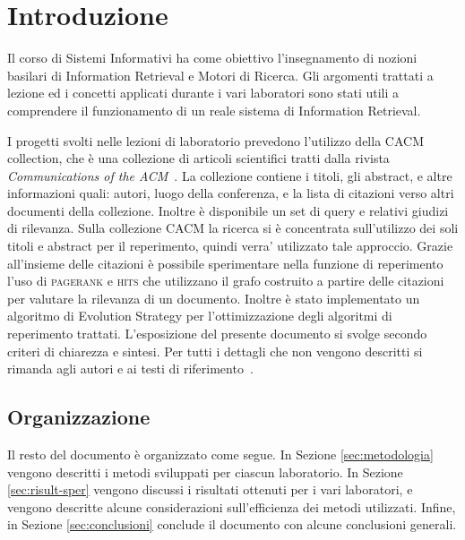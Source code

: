 \section{Introduzione}
\label{sec:introduzione}

Il corso di Sistemi Informativi ha come obiettivo l'insegnamento di nozioni basilari di Information Retrieval e Motori di Ricerca. Gli argomenti trattati a lezione ed i concetti applicati durante i vari laboratori sono stati utili a comprendere il funzionamento di un reale sistema di Information Retrieval.

I progetti svolti nelle lezioni di laboratorio prevedono l'utilizzo della CACM collection, che \`e una collezione di articoli scientifici tratti dalla rivista \textit{Communications of the ACM}~\cite{ACMCollection}. La collezione contiene i titoli, gli abstract, e altre informazioni quali: autori, luogo della conferenza, e la lista di citazioni verso altri documenti della collezione. Inoltre \`e disponibile un set di query e relativi giudizi di rilevanza. Sulla collezione CACM la ricerca si \`e concentrata sull'utilizzo dei soli titoli e abstract per il reperimento, quindi verra' utilizzato tale approccio. Grazie all'insieme delle citazioni \`e possibile sperimentare nella funzione di reperimento l'uso di \textsc{pagerank} e \textsc{hits} che utilizzano il grafo costruito a partire delle citazioni per valutare la rilevanza di un documento. Inoltre \`e stato implementato un algoritmo di Evolution Strategy per l'ottimizzazione degli algoritmi di reperimento trattati. L'esposizione del presente documento si svolge secondo criteri di chiarezza e sintesi. Per tutti i dettagli che non vengono descritti si rimanda agli autori e ai testi di riferimento~\cite{manning2008introduction,melucci2013information,croft2010search}.
\subsection{Organizzazione}
Il resto del documento \`e organizzato come segue. In Sezione \ref{sec:metodologia} vengono descritti i metodi sviluppati per ciascun laboratorio. In Sezione \ref{sec:risult-sper} vengono discussi i risultati ottenuti per i vari laboratori, e vengono descritte alcune considerazioni sull'efficienza dei metodi utilizzati. Infine, in Sezione \ref{sec:conclusioni} conclude il documento con alcune conclusioni generali.

%
